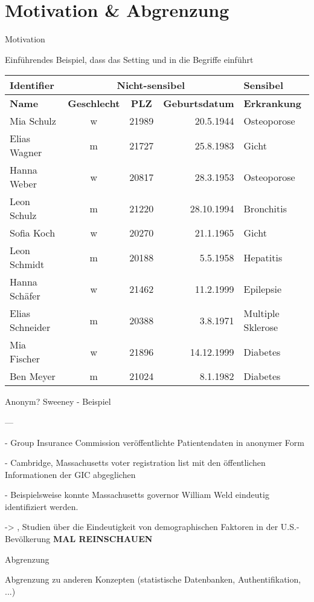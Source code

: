 \section{Motivation \& Abgrenzung}

\begin{frame}{Motivation}

Einführendes Beispiel, dass das Setting und in die Begriffe einführt

	\begin{tabular}{|l|c|c|r|l|}
	\hline \textbf{Identifier} & \multicolumn{3}{c|}{\textbf{Nicht-sensibel}} & \textbf{Sensibel} \\ 
	\hline \textbf{Name} & \textbf{Geschlecht} & \textbf{PLZ} & \textbf{Geburtsdatum} & \textbf{Erkrankung} \\
	\hline \hline Mia Schulz & w & 21989 & 20.5.1944 & Osteoporose \\ 
	\hline Elias Wagner & m & 21727 & 25.8.1983 & Gicht \\ 
	\hline Hanna Weber & w & 20817 & 28.3.1953 & Osteoporose \\ 
	\hline Leon Schulz & m & 21220 & 28.10.1994 & Bronchitis \\ 
	\hline Sofia Koch & w & 20270 & 21.1.1965 & Gicht \\ 
	\hline Leon Schmidt & m & 20188 & 5.5.1958 & Hepatitis \\ 
	\hline Hanna Schäfer & w & 21462 & 11.2.1999 & Epilepsie \\ 
	\hline Elias Schneider & m & 20388 & 3.8.1971 & Multiple Sklerose \\ 
	\hline Mia Fischer & w & 21896 & 14.12.1999 & Diabetes \\ 
	\hline Ben Meyer & m & 21024 & 8.1.1982 & Diabetes \\ 
	\hline 
	\end{tabular}
\end{frame}

\begin{frame}{Anonym?}
Sweeney - Beispiel \cite{sweeney_k_anonymity}

---

- Group Insurance Commission veröffentlichte Patientendaten in anonymer Form

- Cambridge, Massachusetts voter registration list mit den öffentlichen Informationen der GIC abgeglichen

- Beispielsweise konnte Massachusetts governor William Weld eindeutig identifiziert werden.

-> \cite{sweeney_demographics}, \cite{golle_demographics} Studien über die Eindeutigkeit von demographischen Faktoren in der U.S.-Bevölkerung \textbf{MAL REINSCHAUEN}

\end{frame}

\begin{frame}{Abgrenzung}

Abgrenzung zu anderen Konzepten (statistische Datenbanken, Authentifikation, ...)

\end{frame}
